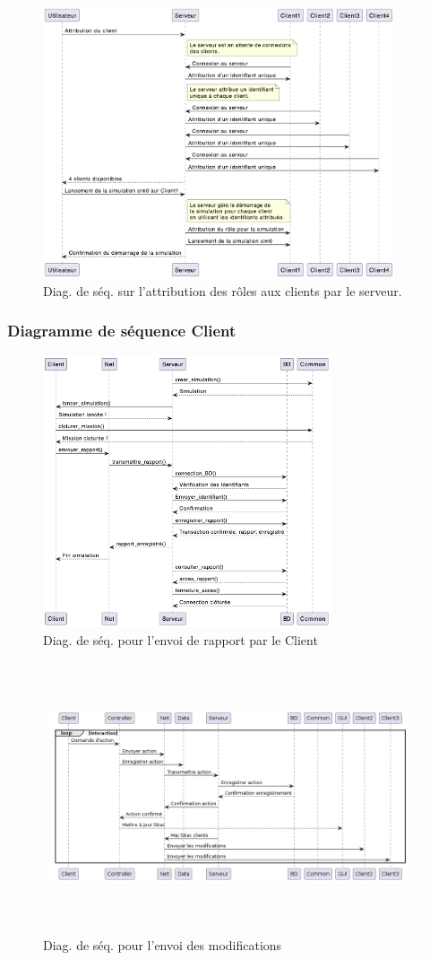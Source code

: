 \begin{figure}[H]
	\centering
	\includegraphics[height=8cm]{img/ServeurRole.png} 
	\caption{Diag. de séq. sur l'attribution des rôles aux clients par le serveur.}
\end{figure}

\subsubsection{Diagramme de séquence Client}
\begin{figure}[H]
	\centering
	\includegraphics[height=8cm]{img/DiagSeq_IntenvoiRapport.png} 
	\caption{Diag. de séq. pour l'envoi de rapport par le Client}
\end{figure}

\begin{figure}[H]
	\centering
	\includegraphics[height=8cm]{img/diagSeqModif.png} 
	\caption{Diag. de séq. pour l'envoi des modifications }
\end{figure}


